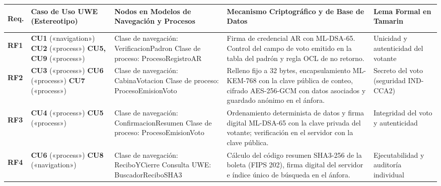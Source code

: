 \begin{table}[!htbp]
	\centering
	\renewcommand{\arraystretch}{1.28}
	\footnotesize
	\begin{tabularx}{\textwidth}{|>{\bfseries\raggedright\arraybackslash}p{1.0cm}|>{\raggedright\arraybackslash}p{3.2cm}|>{\raggedright\arraybackslash}p{3.3cm}|>{\raggedright\arraybackslash}X|>{\raggedright\arraybackslash}p{2.8cm}|}
		\hline
		\textbf{Req.} & \textbf{Caso de Uso UWE (Estereotipo)} & \textbf{Nodos en Modelos de Navegación y Procesos} & \textbf{Mecanismo Criptográfico y de Base de Datos} & \textbf{Lema Formal en Tamarin} \\
		\hline
		\textbf{RF1} & \textbf{CU1} («navigation») \newline \textbf{CU2} («process») \newline \textbf{CU5, CU9} («process») & Clase de navegación: \newline VerificacionPadron \newline Clase de proceso: \newline ProcesoRegistroAR & Firma de credencial AR con ML-DSA-65. Control del campo de voto emitido en la tabla del padrón y regla OCL de no retorno. & Unicidad y autenticidad del votante \\
		\hline
		\textbf{RF2} & \textbf{CU3} («process») \newline \textbf{CU6} («process») \newline \textbf{CU7} («process») & Clase de navegación: \newline CabinaVotacion \newline Clase de proceso: \newline ProcesoEmisionVoto & Relleno fijo a 32 bytes, encapsulamiento ML-KEM-768 con la clave pública de conteo, cifrado AES-256-GCM con datos asociados y guardado anónimo en el ánfora. & Secreto del voto (seguridad IND-CCA2) \\
		\hline
		\textbf{RF3} & \textbf{CU4} («process») \newline \textbf{CU5} («process») & Clase de navegación: \newline ConfirmacionResumen \newline Clase de proceso: \newline ProcesoEmisionVoto & Ordenamiento determinista de datos y firma digital ML-DSA-65 con la clave privada del votante; verificación en el servidor con la clave pública. & Integridad del voto y autenticidad \\
		\hline
		\textbf{RF4} & \textbf{CU6} («process») \newline \textbf{CU8} («navigation») & Clase de navegación: \newline ReciboYCierre \newline Consulta UWE: \newline BuscadorReciboSHA3 & Cálculo del código resumen SHA3-256 de la boleta (FIPS 202), firma digital del servidor e índice único de búsqueda en el ánfora. & Ejecutabilidad y auditoría individual \\

\end{tabularx}
\end{table}
